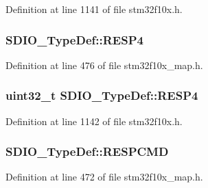 Definition at line 1141 of file stm32f10x.\+h.

\subsubsection[{\texorpdfstring{R\+E\+S\+P4}{RESP4}}]{ S\+D\+I\+O\+\_\+\+Type\+Def\+::\+R\+E\+S\+P4}\hypertarget{struct_s_d_i_o___type_def_a97261fbd8effe236497f94a5cb46d6a9}{}\label{struct_s_d_i_o___type_def_a97261fbd8effe236497f94a5cb46d6a9}


Definition at line 476 of file stm32f10x\+\_\+map.\+h.

\subsubsection[{\texorpdfstring{R\+E\+S\+P4}{RESP4}}]{ {\bf uint32\+\_\+t} S\+D\+I\+O\+\_\+\+Type\+Def\+::\+R\+E\+S\+P4}\hypertarget{struct_s_d_i_o___type_def_ac7b45c7672922d38ffb0a1415a122716}{}\label{struct_s_d_i_o___type_def_ac7b45c7672922d38ffb0a1415a122716}


Definition at line 1142 of file stm32f10x.\+h.

\subsubsection[{\texorpdfstring{R\+E\+S\+P\+C\+MD}{RESPCMD}}]{ S\+D\+I\+O\+\_\+\+Type\+Def\+::\+R\+E\+S\+P\+C\+MD}\hypertarget{struct_s_d_i_o___type_def_a68860550d4d87d906772e782941a69ec}{}\label{struct_s_d_i_o___type_def_a68860550d4d87d906772e782941a69ec}


Definition at line 472 of file stm32f10x\+\_\+map.\+h.


